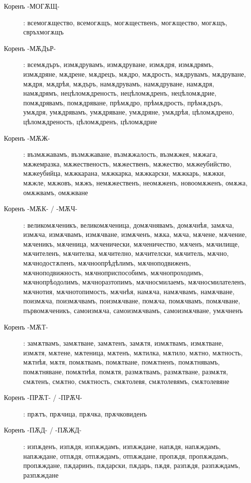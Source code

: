 \documentclass{article}
\begin{document}
\begin{description}
	\item[Коренъ -МОГѪЩ-]: всемогѫщество, всемогѫщъ, могѫщественъ, могѫщество, могѫщъ, свръхмогѫщъ
	
	\item[Коренъ -МѪДъР-]: всемѫдъръ, измѫдрувамъ, измѫдруване, измѫдря, измѫдрямъ, измѫдряне, мѫдрене, мѫдрецъ, мѫдро, мѫдрость, мѫдрувамъ, мѫдруване, мѫдря, мѫдрѣя, мѫдъръ, намѫдрувамъ, намѫдруване, намѫдря, намѫдрямъ, нецѣломѫдреность, нецѣломѫдренъ, нецѣломѫдрие, помѫдрявамъ, помѫдряване, прѣмѫдро, прѣмѫдрость, прѣмѫдъръ, умѫдря, умѫдрявамъ, умѫдряване, умѫдряне, умѫдрѣя, цѣломѫдрено, цѣломѫдреность, цѣломѫдренъ, цѣломѫдрие
	
	\item[Коренъ -МѪЖ-]: възмѫжавамъ, възмѫжаване, възмѫжалость, възмѫжея, мѫжага, мѫжемразка, мѫжественость, мѫжественъ, мѫжество, мѫжеубийство, мѫжеубийца, мѫжкарана, мѫжкарка, мѫжкарски, мѫжкарь, мѫжки, мѫжле, мѫжовъ, мѫжъ, немѫжественъ, неомѫженъ, новоомѫженъ, омѫжа, омѫжвамъ, омѫжване
	
	\item[Коренъ -МѪК- / -МѪЧ-]: великомѫченикъ, великомѫченица, домѫчнявамъ, домѫчнѣя, замѫча, измѫча, измѫчвамъ, измѫчване, измѫченъ, мѫка, мѫча, мѫчене, мѫчение, мѫченикъ, мѫченица, мѫченически, мѫченичество, мѫченъ, мѫчилище, мѫчителенъ, мѫчителка, мѫчително, мѫчителски, мѫчитель, мѫчно, мѫчнодостѫпенъ, мѫчноопрѣдѣлимъ, мѫчноподвиженъ, мѫчноподвижность, мѫчноприспособимъ, мѫчнопроходимъ, мѫчнопрѣодолимъ, мѫчноразтопимъ, мѫчносмилаемъ, мѫчносмилателенъ, мѫчнотия, мѫчнотопимость, мѫчнѣя, намѫча, намѫчвамъ, намѫчване, поизмѫча, поизмѫчвамъ, поизмѫчване, помѫча, помѫчвамъ, помѫчване, първомѫченикъ, самоизмѫча, самоизмѫчвамъ, самоизмѫчване, умѫчненъ
	
	\item[Коренъ -МѪТ-]: замѫтвамъ, замѫтване, замѫтенъ, замѫтя, измѫтвамъ, измѫтване, измѫтя, мѫтене, мѫтеница, мѫтенъ, мѫтилка, мѫтило, мѫтно, мѫтность, мѫтнѣя, мѫтя, помѫтвамъ, помѫтване, помѫтненъ, помѫтнявамъ, помѫтняване, помѫтнѣя, помѫтя, размѫтвамъ, размѫтване, размѫтя, смѫтенъ, смѫтно, смѫтность, смѫтолевя, смѫтолевямъ, смѫтолевяне
	
	\item[Коренъ -ПРѪТ- / -ПРѪЧ-]: прѫтъ, прѫчица, прѫчка, прѫчковиденъ
	
	\item[Коренъ -ПѪД- / -ПѪЖД-]: изпѫденъ, изпѫдя, изпѫждамъ, изпѫждане, напѫдя, напѫждамъ, напѫждане, отпѫдя, отпѫждамъ, отпѫждане, пропѫдя, пропѫждамъ, пропѫждане, пѫдаринъ, пѫдарски, пѫдарь, пѫдя, разпѫдя, разпѫждамъ, разпѫждане
	

\end{description}
\end{document}
